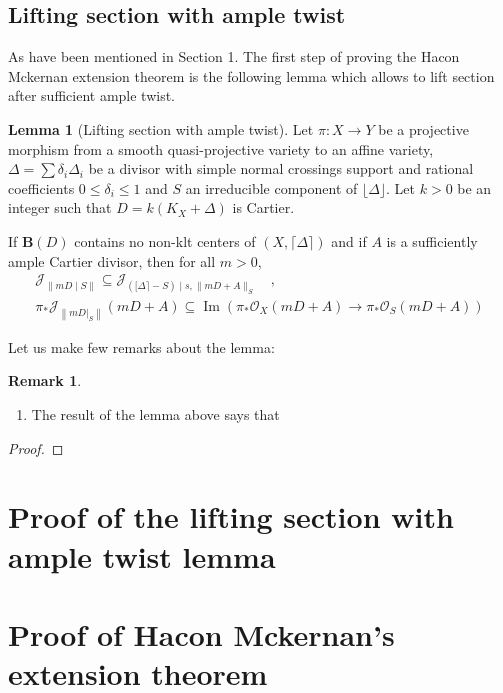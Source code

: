 \documentclass[11pt]{article}
\theoremstyle{definition}
\newtheorem{lemma}[theorem]{Lemma}
\newtheorem{remark}[theorem]{Remark}
\begin{document}
	\subsection{Lifting section with ample twist}
	As have been mentioned in Section 1. The first step of proving the Hacon Mckernan extension theorem is the following lemma which allows to lift section after sufficient ample twist.
	\begin{lemma}[Lifting section with ample twist]
		Let $\pi: X \rightarrow Y$ be a projective morphism from a smooth quasi-projective variety to an affine variety, $\Delta=\sum \delta_i \Delta_i$ be a divisor with simple normal crossings support and rational coefficients $0 \leq \delta_i \leq 1$ and $S$ an irreducible component of $\lfloor\Delta\rfloor$. Let $k>0$ be an integer such that $D=k\left(K_X+\Delta\right)$ is Cartier. 
		
		If $\mathbf{B}(D)$ contains no non-klt centers of $(X,\lceil\Delta\rceil)$ and if $A$ is a sufficiently ample Cartier divisor, then for all $m>0$,
		$$
		\begin{gathered}
			\mathscr{J}_{\|m D \mid S\|} \subseteq \mathscr{J}_{([\Delta\rceil-S) \mid s,\|m D+A\|_S} \quad , \\
			\pi_* \mathscr{J}_{\left\|\left.m D\right|_S\right\|}(m D+A) \subseteq \operatorname{Im}\left(\pi_* \mathscr{O}_X(m D+A) \rightarrow \pi_* \mathscr{O}_S(m D+A)\right)
		\end{gathered}
		$$
		
	\end{lemma}
	Let us make few remarks about the lemma:
	\begin{remark}
		\begin{enumerate}
			\item The result of the lemma above says that 
		\end{enumerate}
	\end{remark}
	\begin{proof}
		
	\end{proof}
	\section{Proof of the lifting section with ample twist lemma}
		
	\section{Proof of Hacon Mckernan's extension theorem}
	
\end{document}
